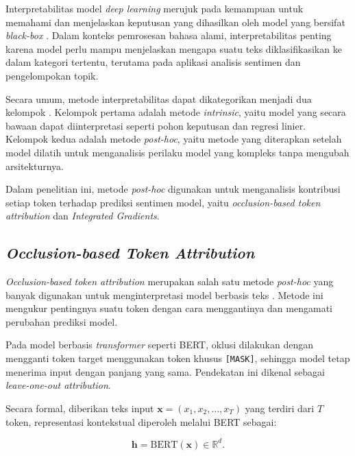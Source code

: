 Interpretabilitas model \textit{deep learning} merujuk pada kemampuan
untuk memahami dan menjelaskan keputusan yang dihasilkan oleh model yang
bersifat \textit{black-box} \parencite{sundararajan2017axiomatic}. Dalam
konteks pemrosesan bahasa alami, interpretabilitas penting karena model
perlu mampu menjelaskan mengapa suatu teks diklasifikasikan ke dalam
kategori tertentu, terutama pada aplikasi analisis sentimen dan
pengelompokan topik.

Secara umum, metode interpretabilitas dapat dikategorikan menjadi dua
kelompok \parencite{li2016visualizing}. Kelompok pertama adalah metode
\textit{intrinsic}, yaitu model yang secara bawaan dapat diinterpretasi
seperti pohon keputusan dan regresi linier. Kelompok kedua adalah metode
\textit{post-hoc}, yaitu metode yang diterapkan setelah model dilatih
untuk menganalisis perilaku model yang kompleks tanpa mengubah
arsitekturnya.

Dalam penelitian ini, metode \textit{post-hoc} digunakan untuk menganalisis
kontribusi setiap token terhadap prediksi sentimen model, yaitu
\textit{occlusion-based token attribution} dan \textit{Integrated
Gradients}.

\subsection{\textit{Occlusion-based Token Attribution}}

\textit{Occlusion-based token attribution} merupakan salah satu metode
\textit{post-hoc} yang banyak digunakan untuk menginterpretasi model
berbasis teks \parencite{zeiler2014visualizing, li2016visualizing}. Metode
ini mengukur pentingnya suatu token dengan cara menggantinya dan mengamati
perubahan prediksi model.

Pada model berbasis \textit{transformer} seperti BERT, oklusi dilakukan
dengan mengganti token target menggunakan token khusus \texttt{[MASK]},
sehingga model tetap menerima input dengan panjang yang sama. Pendekatan
ini dikenal sebagai \textit{leave-one-out attribution}.

Secara formal, diberikan teks input $\mathbf{x} = (x_1, x_2, \ldots,
x_T)$ yang terdiri dari $T$ token, representasi kontekstual diperoleh
melalui BERT sebagai:

\begin{equation}
    \mathbf{h} = \text{BERT}(\mathbf{x}) \in \mathbb{R}^d.
    \label{eq:bert_cls}
\end{equation}


